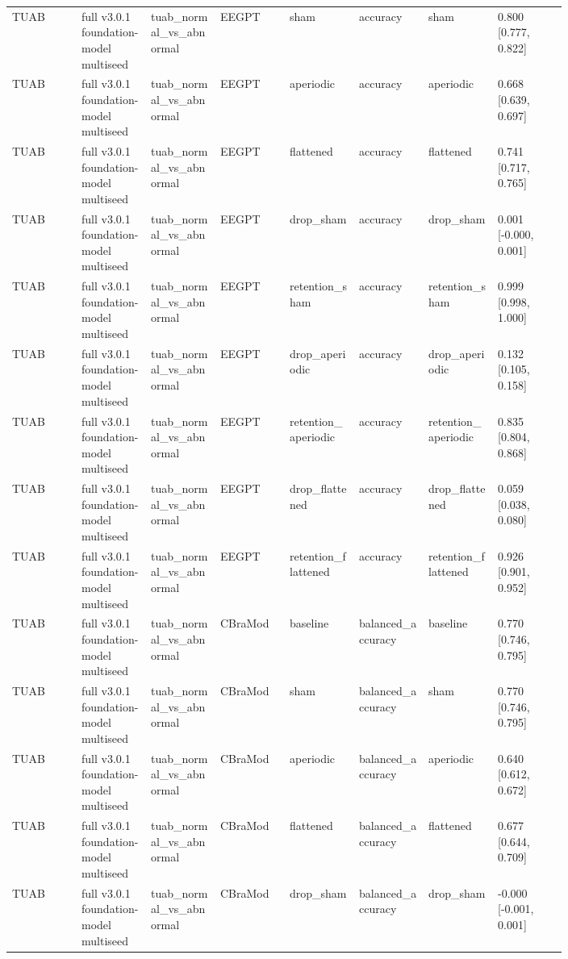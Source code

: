 \begin{longtable}{p{0.10\linewidth}p{0.10\linewidth}p{0.10\linewidth}p{0.10\linewidth}p{0.10\linewidth}p{0.10\linewidth}p{0.10\linewidth}p{0.10\linewidth}}
TUAB & full v3.0.1 foundation-model multiseed & tuab\_normal\_vs\_abnormal & EEGPT & sham & accuracy & sham & 0.800 [0.777, 0.822]\\
TUAB & full v3.0.1 foundation-model multiseed & tuab\_normal\_vs\_abnormal & EEGPT & aperiodic & accuracy & aperiodic & 0.668 [0.639, 0.697]\\
TUAB & full v3.0.1 foundation-model multiseed & tuab\_normal\_vs\_abnormal & EEGPT & flattened & accuracy & flattened & 0.741 [0.717, 0.765]\\
TUAB & full v3.0.1 foundation-model multiseed & tuab\_normal\_vs\_abnormal & EEGPT & drop\_sham & accuracy & drop\_sham & 0.001 [-0.000, 0.001]\\
TUAB & full v3.0.1 foundation-model multiseed & tuab\_normal\_vs\_abnormal & EEGPT & retention\_sham & accuracy & retention\_sham & 0.999 [0.998, 1.000]\\
TUAB & full v3.0.1 foundation-model multiseed & tuab\_normal\_vs\_abnormal & EEGPT & drop\_aperiodic & accuracy & drop\_aperiodic & 0.132 [0.105, 0.158]\\
TUAB & full v3.0.1 foundation-model multiseed & tuab\_normal\_vs\_abnormal & EEGPT & retention\_aperiodic & accuracy & retention\_aperiodic & 0.835 [0.804, 0.868]\\
TUAB & full v3.0.1 foundation-model multiseed & tuab\_normal\_vs\_abnormal & EEGPT & drop\_flattened & accuracy & drop\_flattened & 0.059 [0.038, 0.080]\\
TUAB & full v3.0.1 foundation-model multiseed & tuab\_normal\_vs\_abnormal & EEGPT & retention\_flattened & accuracy & retention\_flattened & 0.926 [0.901, 0.952]\\
TUAB & full v3.0.1 foundation-model multiseed & tuab\_normal\_vs\_abnormal & CBraMod & baseline & balanced\_accuracy & baseline & 0.770 [0.746, 0.795]\\
TUAB & full v3.0.1 foundation-model multiseed & tuab\_normal\_vs\_abnormal & CBraMod & sham & balanced\_accuracy & sham & 0.770 [0.746, 0.795]\\
TUAB & full v3.0.1 foundation-model multiseed & tuab\_normal\_vs\_abnormal & CBraMod & aperiodic & balanced\_accuracy & aperiodic & 0.640 [0.612, 0.672]\\
TUAB & full v3.0.1 foundation-model multiseed & tuab\_normal\_vs\_abnormal & CBraMod & flattened & balanced\_accuracy & flattened & 0.677 [0.644, 0.709]\\
TUAB & full v3.0.1 foundation-model multiseed & tuab\_normal\_vs\_abnormal & CBraMod & drop\_sham & balanced\_accuracy & drop\_sham & -0.000 [-0.001, 0.001]\\

\end{longtable}
